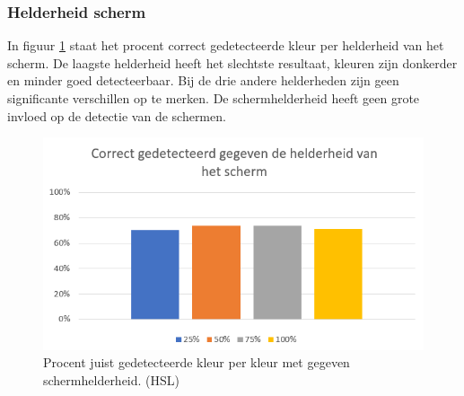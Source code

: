 \subsubsection{Helderheid scherm}
In figuur \ref{fig:helderheid} staat het procent correct gedetecteerde kleur per helderheid van het scherm. De laagste helderheid heeft het slechtste resultaat, kleuren zijn donkerder en minder goed detecteerbaar. Bij de drie andere helderheden zijn geen significante verschillen op te merken. De schermhelderheid heeft geen grote invloed op de detectie van de schermen.
\begin{figure}
	\centering
	\includegraphics[scale=0.7]{img/brightness}
	\caption{Procent juist gedetecteerde kleur per kleur met gegeven schermhelderheid. (HSL)}
	\label{fig:helderheid}
\end{figure}
